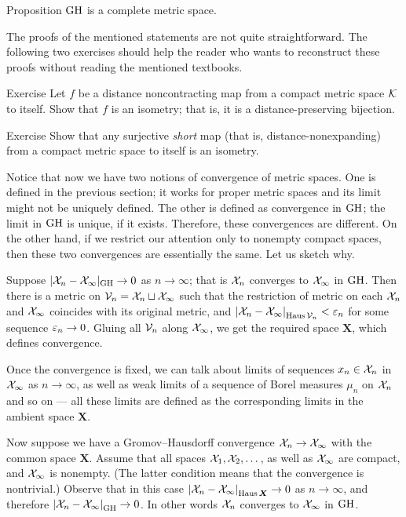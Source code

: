 \begin{thm}{Proposition}\label{prop:complete}
$\operatorname{\rm GH}\nolimits$ is a complete metric space.
\end{thm}

The proofs of the mentioned statements are not quite straightforward.
The following two exercises should help the reader who wants to reconstruct these proofs without reading the mentioned textbooks.


\begin{thm}{Exercise}\label{ex:non-contracting-map}
Let $f$ be a distance noncontracting map from
a compact metric space $\mathcal{K}$ to itself.
Show that $f$ is an isometry; that is, it is a distance-preserving bijection.
\end{thm}

\begin{thm}{Exercise}\label{ex:non-expanding-map}
Show that any surjective \emph{short} map (that is, distance-nonexpanding) from a compact metric space to itself is an isometry.
\end{thm}

Notice that now we have two notions of convergence of metric spaces.
One is defined in the previous section; it works for proper metric spaces and
its limit might not be uniquely defined.
The other is defined as convergence in $\operatorname{\rm GH}\nolimits$;
the limit in $\operatorname{\rm GH}\nolimits$ is unique, if it exists.
Therefore, these convergences are different.
On the other hand, if we restrict our attention only to nonempty compact spaces, then these two convergences are essentially the same.
Let us sketch why.

Suppose $|\mathcal{X}_n-\mathcal{X}_\infty|_{\operatorname{\rm GH}\nolimits}\to 0$ as $n\to \infty$;
that is $\mathcal{X}_n$ converges to $\mathcal{X}_\infty$ in $\operatorname{\rm GH}\nolimits$.
Then there is a metric on $\mathcal{V}_n=\mathcal{X}_n\sqcup \mathcal{X}_\infty$ such that the restriction of metric on each $\mathcal{X}_n$ and $\mathcal{X}_\infty$ coincides with its original metric, and $|{\mathcal{X}_n}-{\mathcal{X}_\infty}|_{\operatorname{\rm Haus}\nolimits\mathcal{V}_n}^{{}}<\varepsilon_n$ for some sequence $\varepsilon_n\to 0$.
Gluing all $\mathcal{V}_n$ along $\mathcal{X}_\infty$, we get the required space $\bm{X}$, which defines convergence.

Once the convergence is fixed, we can talk about limits of sequences $x_n\in \mathcal{X}_n$ in $\mathcal{X}_\infty$ as $n\to\infty$, as well as weak limits of a sequence of Borel measures $\mu_n$ on $\mathcal{X}_n$ and so on --- all these limits are defined as the corresponding limits in the ambient space $\bm{X}$.

Now suppose we have a Gromov--Hausdorff convergence $\mathcal{X}_n\to \mathcal{X}_\infty$ with the common space $\bm{X}$.
Assume that all spaces $\mathcal{X}_1,\mathcal{X}_2,\dots$, as well as $\mathcal{X}_\infty$ are compact, and $\mathcal{X}_\infty$ is nonempty.
(The latter condition means that the convergence is nontrivial.)
Observe that in this case $|{\mathcal{X}_n}-{\mathcal{X}_\infty}|_{\operatorname{\rm Haus}\nolimits\bm{X}}^{{}}\to 0$ as $n\to \infty$,
and therefore $|{\mathcal{X}_n}-{\mathcal{X}_\infty}|_{\operatorname{\rm GH}\nolimits}^{{}}\to 0$.
In other words $\mathcal{X}_n$ converges to $\mathcal{X}_\infty$ in $\operatorname{\rm GH}\nolimits$.

